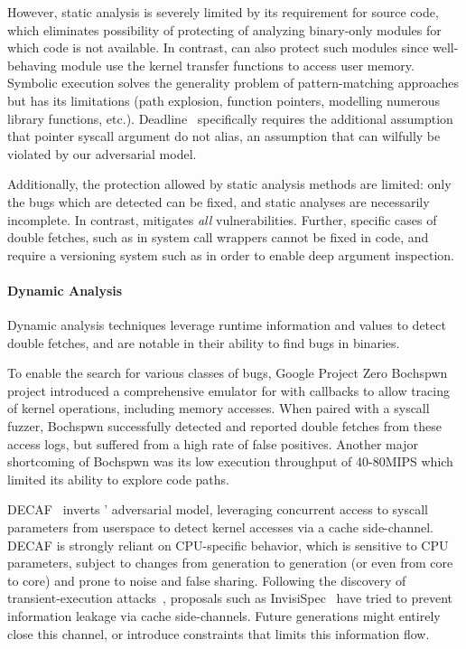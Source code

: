 \documentclass[letterpaper,twocolumn,10pt]{article}
\begin{document}
However, static analysis is severely limited by its requirement for
source code, which eliminates possibility of protecting of analyzing 
binary-only modules for which code is not available. 
In contrast, \midas can also protect such modules since well-behaving
module use the kernel transfer functions to access user memory.
Symbolic execution solves the generality problem of pattern-matching 
approaches but has its limitations (path explosion, function pointers, 
modelling numerous library functions, etc.).
Deadline~\cite{deadline} specifically requires the additional assumption
that pointer syscall argument do not alias, an assumption that can 
wilfully be violated by our adversarial model.

Additionally, the protection allowed by static analysis methods are 
limited: only the bugs which are detected can be fixed, and static 
analyses are necessarily incomplete.
In contrast, \midas mitigates \emph{all} \tocttou vulnerabilities.
Further, specific cases of double fetches, such as in system call wrappers
cannot be fixed in code, and require a versioning system such as 
\midas in order to enable deep argument inspection.

\paragraph{Dynamic Analysis}
%
Dynamic analysis techniques leverage runtime information and values 
to detect double fetches, and are notable in their ability to 
find bugs in binaries.

To enable the search for various classes of bugs, Google Project Zero 
Bochspwn~\cite{jurczyk2013bochspwn} project introduced
a comprehensive emulator for  with callbacks to allow 
tracing of kernel operations, including memory accesses.
When paired with a syscall fuzzer, 
Bochspwn successfully detected and reported double fetches from
these access logs, but suffered from a high rate of false positives.
Another major shortcoming of Bochspwn was its low execution throughput
of 40-80MIPS which limited its ability to explore code paths.

DECAF~\cite{schwartzDECAF} inverts \midas' adversarial model, leveraging 
concurrent access to syscall parameters from userspace to detect kernel 
accesses via a cache side-channel.
DECAF is strongly reliant on CPU-specific behavior, which 
is sensitive to CPU parameters, subject to changes from generation to 
generation (or even from core to core) and prone to noise and false sharing. 
Following the discovery of transient-execution attacks~\cite{kocher18spectre},
proposals such as InvisiSpec~\cite{YanInvisispec,KhasawnehKSEPA19} have 
tried to prevent 
information leakage via cache side-channels.
Future generations might entirely close this channel, or introduce constraints 
that limits this information flow. 
\end{document}
